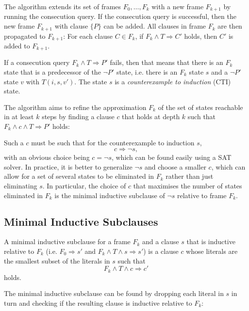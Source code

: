 \documentclass[12pt,a4paper,twoside,openright]{report}
\begin{document}
{%
The algorithm extends its set of frames $F_0,\ldots,F_k$ with a new frame
$F_{k + 1}$ by running the consecution query.
If the consecution query is successful, then the new frame $F_{k + 1}$
with clause $\{P\}$ can be added.
All clauses in frame $F_k$ are then propagated to $F_{k + 1}$:
For each clause $C \in F_k$, if $F_k \wedge T \Rightarrow C'$ holds, then $C'$
is added to $F_{k + 1}$.

If a consecution query $F_k \wedge T \Rightarrow P'$ fails, then that means that
there is an $F_k$ state that is a predecessor of the $\neg P'$ state,
i.e. there is an $F_k$ state $s$ and a $\neg P'$ state $v$ with $T(i,s,v')$.
The state
$s$ is a \emph{counterexample to induction} (CTI) state.

The algorithm aims to refine the approximation $F_k$ of the set of states
reachable in at least $k$ steps
by finding a clause $c$ that holds at depth $k$ such that
$F_k \wedge c \wedge T \Rightarrow P'$ holds:

Such a $c$ must be such that for the counterexample to induction $s$,
$$c \Rightarrow \neg s,$$
with an obvious choice being $c = \neg s$, which can be found easily using
a SAT solver. In practice, it is better to generalize $\neg s$ and choose
a smaller $c$,
which can allow for a set of several states to be eliminated in $F_k$
rather than just eliminating $s$. In particular, the choice of $c$ that
maximises the number of states eliminated in $F_k$ is the minimal
inductive subclause of $\neg s$ relative to frame $F_k$.

\subsection{Minimal Inductive Subclauses}
A minimal inductive subclause for a frame $F_k$ and a clause $s$ that
is inductive relative to $F_k$
(i.e. $F_0 \Rightarrow s'$ and $F_k \wedge T \wedge s \Rightarrow s'$)
is a clause $c$ whose
literals are the smallest subset of the literals in $s$ such that
$$F_k \wedge T \wedge c \Rightarrow c'$$
holds.

The minimal inductive subclause can be found by dropping each literal
in $s$ in turn and checking if the resulting clause is inductive
relative to $F_k$:

\begin{algorithm}[H]
\DontPrintSemicolon
{}
\end{algorithm}

}
\end{document}
